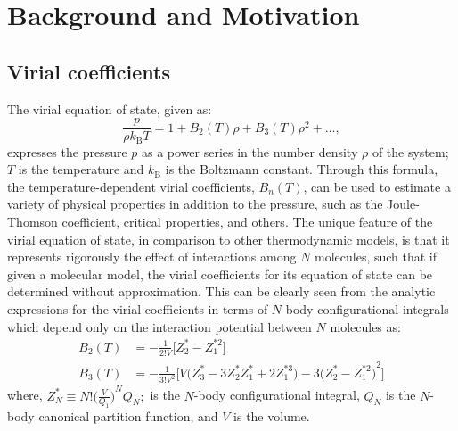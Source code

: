 \chapter{Background and Motivation} \label{chap:background and motivation}
    \section{Virial coefficients}
        The virial equation of state, given as:
        \begin{equation}
          \frac{p}{\rho k_\textrm{B}T} = 1 + B_2(T) \rho + B_3(T) \rho^2 + \ldots,
        \end{equation}
        expresses the pressure $p$ as a power series in the number density $\rho$ of the system; $T$ is the temperature and $k_\textrm{B}$ is the Boltzmann constant. Through this formula, the temperature-dependent virial coefficients, $B_n(T)$, can be used to estimate a variety of physical properties in addition to the pressure, such as the Joule-Thomson coefficient,  critical properties, and others. The unique feature of the virial equation of state, in comparison to other thermodynamic models, is that it represents rigorously the effect of interactions among $N$ molecules, such that if given a molecular model, the virial coefficients for its equation of state can be determined without approximation. This can be clearly seen from the analytic expressions for the virial coefficients in terms of $N$-body configurational integrals \cite{Tester} which depend only on the interaction potential between $N$ molecules as:
        \begin{equation}\label{eq: bn}
            \begin{aligned}
                B_2(T) &= - \frac{1}{2! {V}}  \Big[ Z_2^* - Z_1^{*2} \Big]\\
                B_3(T) &= - \frac{1}{3! {V}^2}  \Big[ {V}  \big( Z_3^* - 3  Z_2^*  Z_1^* + 2  Z_1^{*3} \big) - 3  {\big( Z_2^* - Z_1^{*2} \big)}^2 \Big]
            \end{aligned}
        \end{equation}
        where, $ Z_N^* \equiv N!  {\Big( \displaystyle\frac{{V}}{Q_1} \Big)}^N  Q_N ;$ is the $N$-body configurational integral, $Q_N$ is the $N$-body canonical partition function, and ${V}$ is the volume.


